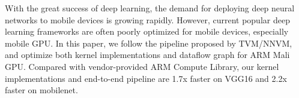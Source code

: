 With the great success of deep learning, the demand for deploying deep neural networks to mobile devices is 
growing rapidly. However, current popular deep learning frameworks are often poorly optimized for mobile devices,
especially mobile GPU.
In this paper, we follow the pipeline proposed by TVM/NNVM, and optimize both kernel implementations and dataflow graph for ARM Mali GPU.
Compared with vendor-provided ARM Compute Library,  our kernel implementations and end-to-end pipeline are 1.7x faster on VGG16 and 2.2x faster on mobilenet.
